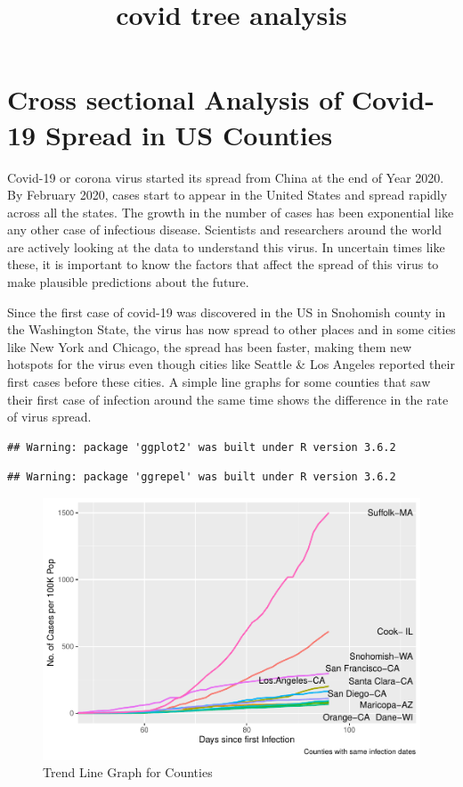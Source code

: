 \documentclass[
]{article}
\title{covid tree analysis}
\author{}
\date{\vspace{-2.5em}}
\begin{document}
\maketitle

\hypertarget{cross-sectional-analysis-of-covid-19-spread-in-us-counties}{%
\section{Cross sectional Analysis of Covid-19 Spread in US
Counties}\label{cross-sectional-analysis-of-covid-19-spread-in-us-counties}}

Covid-19 or corona virus started its spread from China at the end of
Year 2020. By February 2020, cases start to appear in the United States
and spread rapidly across all the states. The growth in the number of
cases has been exponential like any other case of infectious disease.
Scientists and researchers around the world are actively looking at the
data to understand this virus. In uncertain times like these, it is
important to know the factors that affect the spread of this virus to
make plausible predictions about the future.

Since the first case of covid-19 was discovered in the US in Snohomish
county in the Washington State, the virus has now spread to other places
and in some cities like New York and Chicago, the spread has been
faster, making them new hotspots for the virus even though cities like
Seattle \& Los Angeles reported their first cases before these cities. A
simple line graphs for some counties that saw their first case of
infection around the same time shows the difference in the rate of virus
spread.

\begin{verbatim}
## Warning: package 'ggplot2' was built under R version 3.6.2
\end{verbatim}

\begin{verbatim}
## Warning: package 'ggrepel' was built under R version 3.6.2
\end{verbatim}

\begin{figure}
\centering
\includegraphics{covid_tree_analysis_files/figure-latex/unnamed-chunk-2-1.pdf}
\caption{Trend Line Graph for Counties}
\end{figure}
\end{document}
